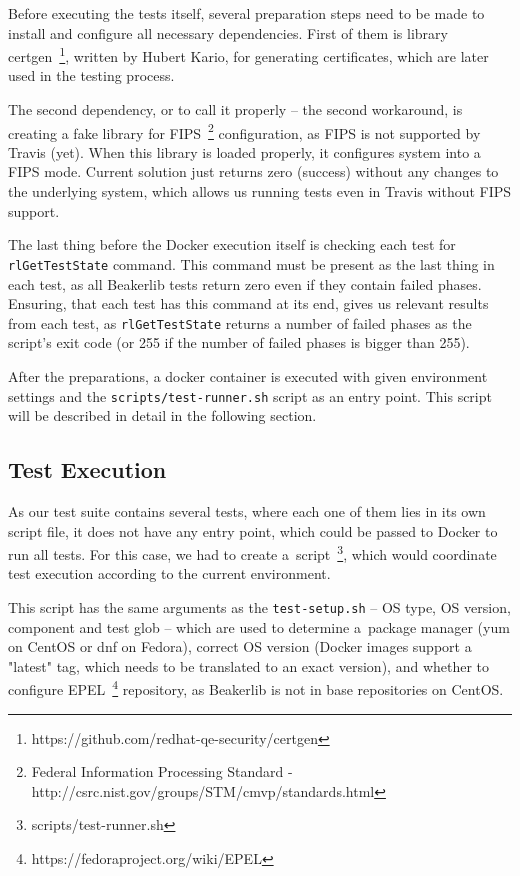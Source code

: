     Before executing the tests itself, several preparation steps need to be made
    to install and configure all necessary dependencies. First of them is
    library certgen~\footnote{https://github.com/redhat-qe-security/certgen},
    written by Hubert Kario, for generating certificates, which are later used
    in the testing process.

    The second dependency, or to call it properly -- the second workaround, is
    creating a fake library for
    FIPS~\footnote{Federal Information Processing Standard - http://csrc.nist.gov/groups/STM/cmvp/standards.html}
    configuration, as FIPS is not supported
    by Travis (yet). When this library is loaded properly, it configures
    system into a FIPS mode. Current solution just returns zero (success) without
    any changes to the underlying system, which allows us running tests even in
    Travis without FIPS support.

    The last thing before the Docker execution itself is checking each test
    for \texttt{rlGetTestState} command. This command must be present as
    the last thing in each test, as all Beakerlib tests return zero even
    if they contain failed phases. Ensuring, that each test has this command
    at its end, gives us relevant results from each test, as
    \texttt{rlGetTestState} returns a number of failed phases as the script's
    exit code (or 255 if the number of failed phases is bigger than 255).

    After the preparations, a docker container is executed with given environment
    settings and the \texttt{scripts/test-runner.sh} script as an entry point.
    This script will be described in detail in the following section.

\subsection{Test Execution}
    As our test suite contains several tests, where each one of them lies in
    its own script file, it does not have any entry point, which could be passed
    to Docker to run all tests. For this case, we had to create
    a~script~\footnote{scripts/test-runner.sh},
    which would coordinate test execution according to the current environment.

    This script has the same arguments as the \texttt{test-setup.sh} -- OS type,
    OS version, component and test glob -- which are used to determine
    a~package manager (yum on CentOS or dnf on Fedora), correct OS version
    (Docker images support a "latest" tag, which needs to be translated to
    an exact version), and whether to configure
    EPEL~\footnote{https://fedoraproject.org/wiki/EPEL} repository, as Beakerlib
    is not in base repositories on CentOS.

